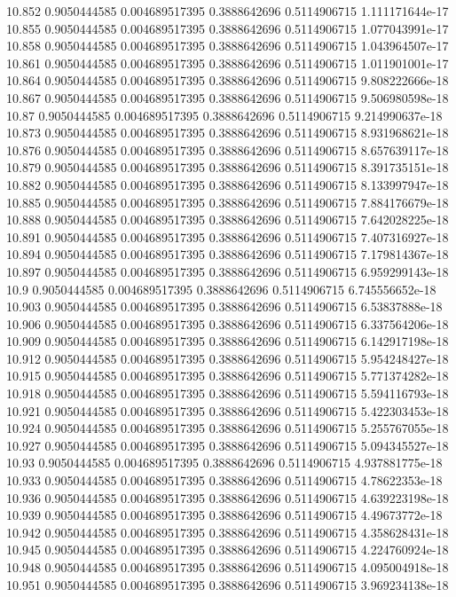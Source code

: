 {10.852 0.9050444585 0.004689517395 0.3888642696 0.5114906715 1.111171644e-17
10.855 0.9050444585 0.004689517395 0.3888642696 0.5114906715 1.077043991e-17
10.858 0.9050444585 0.004689517395 0.3888642696 0.5114906715 1.043964507e-17
10.861 0.9050444585 0.004689517395 0.3888642696 0.5114906715 1.011901001e-17
10.864 0.9050444585 0.004689517395 0.3888642696 0.5114906715 9.808222666e-18
10.867 0.9050444585 0.004689517395 0.3888642696 0.5114906715 9.506980598e-18
10.87 0.9050444585 0.004689517395 0.3888642696 0.5114906715 9.214990637e-18
10.873 0.9050444585 0.004689517395 0.3888642696 0.5114906715 8.931968621e-18
10.876 0.9050444585 0.004689517395 0.3888642696 0.5114906715 8.657639117e-18
10.879 0.9050444585 0.004689517395 0.3888642696 0.5114906715 8.391735151e-18
10.882 0.9050444585 0.004689517395 0.3888642696 0.5114906715 8.133997947e-18
10.885 0.9050444585 0.004689517395 0.3888642696 0.5114906715 7.884176679e-18
10.888 0.9050444585 0.004689517395 0.3888642696 0.5114906715 7.642028225e-18
10.891 0.9050444585 0.004689517395 0.3888642696 0.5114906715 7.407316927e-18
10.894 0.9050444585 0.004689517395 0.3888642696 0.5114906715 7.179814367e-18
10.897 0.9050444585 0.004689517395 0.3888642696 0.5114906715 6.959299143e-18
10.9 0.9050444585 0.004689517395 0.3888642696 0.5114906715 6.745556652e-18
10.903 0.9050444585 0.004689517395 0.3888642696 0.5114906715 6.53837888e-18
10.906 0.9050444585 0.004689517395 0.3888642696 0.5114906715 6.337564206e-18
10.909 0.9050444585 0.004689517395 0.3888642696 0.5114906715 6.142917198e-18
10.912 0.9050444585 0.004689517395 0.3888642696 0.5114906715 5.954248427e-18
10.915 0.9050444585 0.004689517395 0.3888642696 0.5114906715 5.771374282e-18
10.918 0.9050444585 0.004689517395 0.3888642696 0.5114906715 5.594116793e-18
10.921 0.9050444585 0.004689517395 0.3888642696 0.5114906715 5.422303453e-18
10.924 0.9050444585 0.004689517395 0.3888642696 0.5114906715 5.255767055e-18
10.927 0.9050444585 0.004689517395 0.3888642696 0.5114906715 5.094345527e-18
10.93 0.9050444585 0.004689517395 0.3888642696 0.5114906715 4.937881775e-18
10.933 0.9050444585 0.004689517395 0.3888642696 0.5114906715 4.78622353e-18
10.936 0.9050444585 0.004689517395 0.3888642696 0.5114906715 4.639223198e-18
10.939 0.9050444585 0.004689517395 0.3888642696 0.5114906715 4.49673772e-18
10.942 0.9050444585 0.004689517395 0.3888642696 0.5114906715 4.358628431e-18
10.945 0.9050444585 0.004689517395 0.3888642696 0.5114906715 4.224760924e-18
10.948 0.9050444585 0.004689517395 0.3888642696 0.5114906715 4.095004918e-18
10.951 0.9050444585 0.004689517395 0.3888642696 0.5114906715 3.969234138e-18
}
